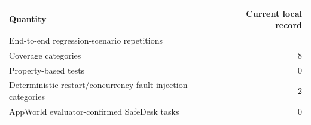 \begin{center}
\small
\begin{tabular}{@{}lr@{}}
\toprule
Quantity & Current local record \\
\midrule
End-to-end regression-scenario repetitions & \PrototypeValidationRepetitionCount{} \\
Coverage categories & 8 \\
Property-based tests & 0 \\
Deterministic restart/concurrency fault-injection categories & 2 \\
AppWorld evaluator-confirmed SafeDesk tasks & 0 \\
\bottomrule
\end{tabular}
\end{center}
